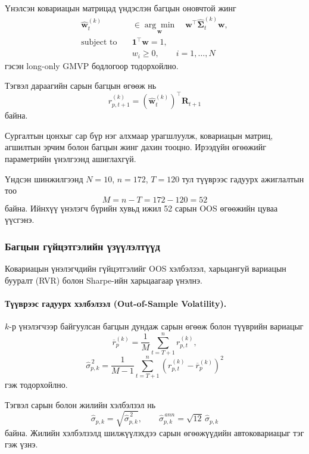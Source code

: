 Үнэлсэн ковариацын матрицад үндэслэн
багцын оновчтой жинг
\[
\begin{aligned}
	\widehat{\boldsymbol{w}}_t^{(k)}
	&\in
	\underset{\boldsymbol{w}}{\arg\min}
	\quad
	\boldsymbol{w}^{\top}
	\widehat{\boldsymbol{\Sigma}}_t^{(k)}
	\boldsymbol{w},\\
	\text{subject to}\quad
	&\boldsymbol{1}^{\top}\boldsymbol{w}=1,\\
	&w_i\geq 0,\qquad i=1,\ldots,N
\end{aligned}
\]
гэсэн long-only GMVP бодлогоор тодорхойлно.

Тэгвэл дараагийн сарын багцын өгөөж нь
\[
r_{p,t+1}^{(k)}
=
\left(\widehat{\boldsymbol{w}}_t^{(k)}\right)^\top
\boldsymbol{R}_{t+1}
\]
байна.

Сургалтын цонхыг сар бүр нэг алхмаар
урагшлуулж, ковариацын матриц, агшилтын
эрчим болон багцын жинг дахин тооцно.
Ирээдүйн өгөөжийг параметрийн үнэлгээнд
ашиглахгүй.

Үндсэн шинжилгээнд $N=10$, $n=172$,
$T=120$ тул түүврээс гадуурх ажиглалтын тоо
\[
M=n-T=172-120=52
\]
байна. Ийнхүү үнэлэгч бүрийн хувьд
ижил 52 сарын OOS өгөөжийн цуваа үүсгэнэ.


\subsubsection{Багцын гүйцэтгэлийн үзүүлэлтүүд}
\label{subsubsec:performance_measures}

Ковариацын үнэлэгчдийн гүйцэтгэлийг
OOS хэлбэлзэл, харьцангуй вариацын
бууралт (RVR) болон Sharpe-ийн
харьцаагаар үнэлнэ.

\paragraph{Түүврээс гадуурх хэлбэлзэл
	(Out-of-Sample Volatility).}

$k$-р үнэлэгчээр байгуулсан багцын
дундаж сарын өгөөж болон түүврийн
вариацыг
\[
\overline{r}_p^{(k)}
=
\frac{1}{M}
\sum_{t=T+1}^{n}r_{p,t}^{(k)},
\]
\[
\widehat{\sigma}_{p,k}^{\,2}
=
\frac{1}{M-1}
\sum_{t=T+1}^{n}
\left(
r_{p,t}^{(k)}
-
\overline{r}_p^{(k)}
\right)^2
\]
гэж тодорхойлно.

Тэгвэл сарын болон жилийн хэлбэлзэл нь
\[
\widehat{\sigma}_{p,k}
=
\sqrt{\widehat{\sigma}_{p,k}^{\,2}},
\qquad
\widehat{\sigma}_{p,k}^{\,ann}
=
\sqrt{12}\,\widehat{\sigma}_{p,k}
\]
байна. Жилийн хэлбэлзэлд шилжүүлэхдээ
сарын өгөөжүүдийн автоковариацыг тэг
гэж үзнэ.

